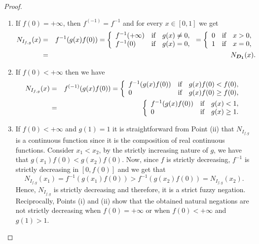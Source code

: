 \begin{proof}
	\begin{enumerate}[label=(\roman*)]
		\item If $f(0)=+\infty$, then $f^{(-1)}=f^{-1}$ and for every $x \in [0,1]$ we get
		\begin{eqnarray*}
			N_{I_{f,g}}(x)&=&f^{-1}(g(x)f(0)) = \left\{ \begin{array}{lcc}
				f^{-1}(+ \infty) &   \hbox{if}  & g(x) \not = 0, \\
				f^{-1}(0) &  \hbox{if} & g(x) = 0,
			\end{array}
			\right.
			=
			\left\{ \begin{array}{lcc}
				0 &   \hbox{if}  & x>0, \\
				1 &  \hbox{if} & x=0,
			\end{array}
			\right. \\
			&=& N_{\bm{D_1}}(x).
		\end{eqnarray*}
		\item If $f(0) < + \infty$ then we have
		\begin{eqnarray*}
			N_{I_{f,g}}(x)&=&f^{(-1)}(g(x)f(0)) =            \left\{ \begin{array}{lcc}
				f^{-1}(g(x)f(0)) &   \hbox{if}  & g(x)f(0) < f(0), \\
				0 &  \hbox{if} & g(x)f(0)\geq f(0),
			\end{array}
			\right. \\
			&=&
			\left\{ \begin{array}{lcc}
				f^{-1}(g(x)f(0)) &   \hbox{if}  & g(x) < 1, \\
				0 &  \hbox{if} & g(x)\geq 1.
			\end{array}
			\right.
		\end{eqnarray*}
		\item If $f(0) < + \infty$ and $g(1)=1$ it is straightforward from Point (ii) that $N_{I_{f,g}}$ is a continuous function since it is the composition of real continuous functions. Consider $x_1<x_2$, by the strictly increasing nature of $g$, we have that $g(x_1)f(0) < g(x_2)f(0)$. Now, since $f$ is strictly decreasing, $f^{-1}$ is strictly decreasing in $[0,f(0)]$ and we get that
		$$N_{I_{f,g}}(x_1)=f^{-1}(g(x_1)f(0))>f^{-1}(g(x_2)f(0))=N_{I_{f,g}}(x_2).$$
		Hence, $N_{I_{f,g}}$ is strictly decreasing and therefore, it is a strict fuzzy negation. Reciprocally, Points (i) and (ii) show that the obtained natural negations are not strictly decreasing when $f(0)=+\infty$ or when $f(0)<+\infty$ and $g(1)>1$.
	\end{enumerate}
\end{proof}

